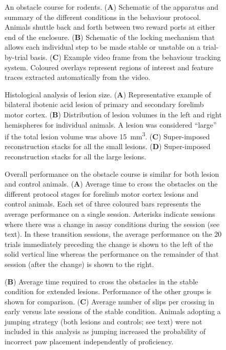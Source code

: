 
\begin{figure}
\centering

\caption{An obstacle course for rodents. (\textbf{A}) Schematic of the apparatus and summary of the different conditions in the behaviour protocol. Animals shuttle back and forth between two reward ports at either end of the enclosure. (\textbf{B}) Schematic of the locking mechanism that allows each individual step to be made stable or unstable on a trial-by-trial basis. (\textbf{C}) Example video frame from the behaviour tracking system. Coloured overlays represent regions of interest and feature traces extracted automatically from the video.}
\label{fig:assay}
\end{figure}

\begin{figure}
\centering

\caption{Histological analysis of lesion size. (\textbf{A}) Representative example of bilateral ibotenic acid lesion of primary and secondary forelimb motor cortex. (\textbf{B}) Distribution of lesion volumes in the left and right hemispheres for individual animals. A lesion was considered ``large'' if the total lesion volume was above \SI{15}{\milli\meter\cubed}. (\textbf{C}) Super-imposed reconstruction stacks for all the small lesions. (\textbf{D}) Super-imposed reconstruction stacks for all the large lesions.}
\label{fig:histology}
\end{figure}

\begin{figure}
\centering

\caption{Overall performance on the obstacle course is similar for both lesion and control animals. (\textbf{A}) Average time to cross the obstacles on the different protocol stages for forelimb motor cortex lesions and control animals. Each set of three coloured bars represents the average performance on a single session. Asterisks indicate sessions where there was a change in assay conditions during the session (see text). In these transition sessions, the average performance on the 20 trials immediately preceding the change is shown to the left of the solid vertical line whereas the performance on the remainder of that session (after the change) is shown to the right.}
\label{fig:learning}
\end{figure}

\begin{figure}
\centering
\caption{(\textbf{B}) Average time required to cross the obstacles in the stable condition for extended lesions. Performance of the other groups is shown for comparison. (\textbf{C}) Average number of slips per crossing in early versus late sessions of the stable condition. Animals adopting a jumping strategy (both lesions and controls; see text) were not included in this analysis as jumping increased the probability of incorrect paw placement independently of proficiency.}
\label{fig:slips}
\end{figure}


